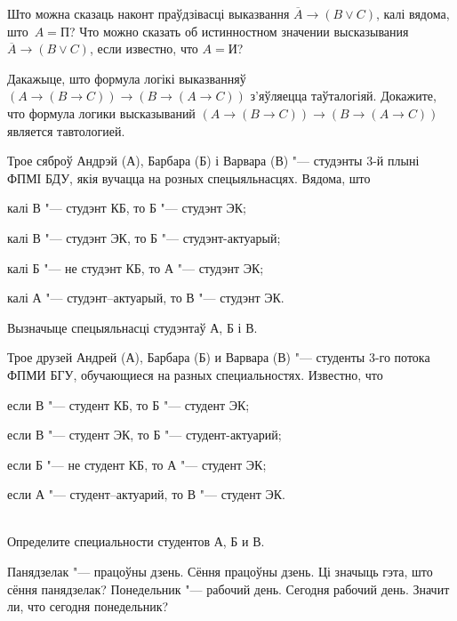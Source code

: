 \documentclass[12pt, a4paper]{article}
\begin{document}
\begin{problemList}

\problemItemSimple
{Што можна сказаць наконт праўдзівасці выказвання $\overline{A} \to (B \vee C)$, калі вядома, што~$A = \mbox{П}$?}
{Что можно сказать об истинностном значении высказывания $\overline{A} \to (B \vee C)$, если известно, что $A = \mbox{И}$?}

\bigskip

\problemItemSimple
{Дакажыце, што формула логікі выказванняў $(A \to (B \to C)) \to (B \to (A \to C))$ з'яўляецца таўталогіяй.}
{Докажите, что формула логики высказываний $(A \to (B \to C)) \to (B \to (A \to C))$ является тавтологией.}

\bigskip

\problemItemSimple
{Трое сяброў Андрэй (А), Барбара (Б) і Варвара (В) "--- студэнты 3-й плыні ФПМІ БДУ, якія вучацца на розных спецыяльнасцях.
Вядома, што
\begin{belarusianEnumerate}
    \item калі В "--- студэнт КБ, то Б "--- студэнт ЭК;
    \item калі В "--- студэнт ЭК, то Б "--- студэнт-актуарый;
    \item калі Б "--- не студэнт КБ, то А "--- студэнт ЭК;
    \item калі А "--- студэнт–актуарый, то В "--- студэнт ЭК.
\end{belarusianEnumerate}

\vspace{-8pt}
Вызначыце спецыяльнасці студэнтаў А, Б і В.}
{Трое друзей Андрей (А), Барбара (Б) и Варвара (В) "--- студенты 3-го потока ФПМИ БГУ, обучающиеся на разных специальностях.
Известно, что
\begin{russianEnumerate}
    \item если В "--- студент КБ, то Б "--- студент ЭК;
    \item если В "--- студент ЭК, то Б "--- студент-актуарий;
    \item если Б "--- не студент КБ, то А "--- студент ЭК;
    \item если А "--- студент–актуарий, то В "--- студент ЭК.
\end{russianEnumerate}\\
Определите специальности студентов А, Б и В.}

\bigskip

\problemItemSimple
{Панядзелак "--- працоўны дзень. Сёння працоўны дзень. Ці значыць гэта, што сёння панядзелак?}
{Понедельник "--- рабочий день. Сегодня рабочий день. Значит ли, что сегодня понедельник?}


\end{problemList}
\end{document}
